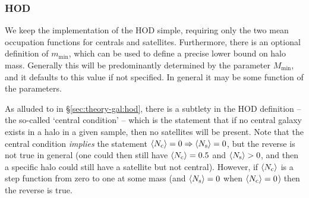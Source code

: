 \documentclass[5p,aas_macros]{elsarticle}
\newcommand{\Nc}{\langle N_{\rm c} \rangle} %
\newcommand{\Ns}{\langle N_{\rm s} \rangle} %
\begin{document}
\subsubsection{HOD}
\label{sec:halomod:components:hod}
We keep the implementation of the HOD simple, requiring only the two mean occupation functions for centrals and satellites. Furthermore, there is an optional definition of $m_\text{min}$, which can be used to define a precise lower bound on halo mass. Generally this will be predominantly determined by the parameter $M_\text{min}$, and it defaults to this value if not specified. In general it may be some function of the parameters.

As alluded to in \S\ref{sec:theory-gal:hod}, there is a subtlety in the HOD definition -- the so-called `central condition' -- which is the statement that if no central galaxy exists in a halo in a given sample, then no satellites will be present. Note that the central condition \textit{implies} the statement $\Nc=0 \Rightarrow \Ns=0$, but the reverse is not true in general (one could then still have $\Nc = 0.5$ and $\Ns > 0$, and then a specific halo could still have a satellite but not central). However, if $\Nc$ is a step function from zero to one at some mass (and $\Ns=0$ when $\Nc=0$) then the reverse is true.
\end{document}
